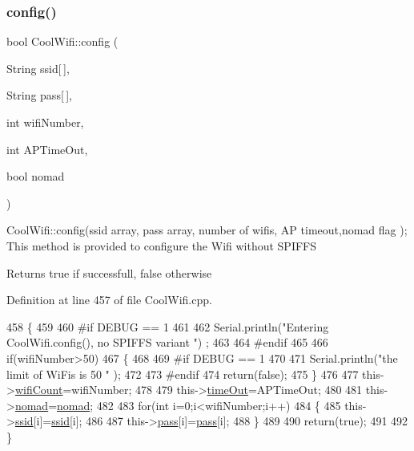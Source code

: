 \subsubsection{\texorpdfstring{config()}{config()}\hspace{0.1cm}{\footnotesize\ttfamily [2/2]}}
{\footnotesize\ttfamily bool Cool\+Wifi\+::config (\begin{DoxyParamCaption}\item[{String}]{ssid\mbox{[}$\,$\mbox{]},  }\item[{String}]{pass\mbox{[}$\,$\mbox{]},  }\item[{int}]{wifi\+Number,  }\item[{int}]{A\+P\+Time\+Out,  }\item[{bool}]{nomad }\end{DoxyParamCaption})}

Cool\+Wifi\+::config(ssid array, pass array, number of wifis, A\+P timeout,nomad flag ); This method is provided to configure the Wifi without S\+P\+I\+F\+FS

\begin{DoxyReturn}{Returns}
true if successfull, false otherwise 
\end{DoxyReturn}


Definition at line 457 of file Cool\+Wifi.\+cpp.


\begin{DoxyCode}
458 \{
459 
460 \textcolor{preprocessor}{#if DEBUG == 1 }
461     
462     Serial.println(\textcolor{stringliteral}{"Entering CoolWifi.config(), no SPIFFS variant "}) ;
463     
464 \textcolor{preprocessor}{#endif}
465     
466     \textcolor{keywordflow}{if}(wifiNumber>50)
467     \{
468     
469 \textcolor{preprocessor}{    #if DEBUG == 1 }
470         
471         Serial.println(\textcolor{stringliteral}{"the limit of WiFis is 50 "} );
472         
473 \textcolor{preprocessor}{    #endif}
474         \textcolor{keywordflow}{return}(\textcolor{keyword}{false});  
475     \}
476 
477     this->\hyperlink{class_cool_wifi_ab133bd92fcb895b884deecd6678592e4}{wifiCount}=wifiNumber;
478 
479     this->\hyperlink{class_cool_wifi_a952111605f25156588b5632caaba1c6f}{timeOut}=APTimeOut;
480 
481     this->\hyperlink{class_cool_wifi_ab7d9643c4af7bac3be331ef008b2ea27}{nomad}=\hyperlink{class_cool_wifi_ab7d9643c4af7bac3be331ef008b2ea27}{nomad};
482     
483     \textcolor{keywordflow}{for}(\textcolor{keywordtype}{int} i=0;i<wifiNumber;i++)
484     \{
485         this->\hyperlink{class_cool_wifi_a893b21d0fed821438733bba2e73fb4c2}{ssid}[i]=\hyperlink{class_cool_wifi_a893b21d0fed821438733bba2e73fb4c2}{ssid}[i];
486         
487         this->\hyperlink{class_cool_wifi_a0c3332a149245aaad060b32593a54c9b}{pass}[i]=\hyperlink{class_cool_wifi_a0c3332a149245aaad060b32593a54c9b}{pass}[i];
488     \}
489         
490     \textcolor{keywordflow}{return}(\textcolor{keyword}{true});
491 
492 \}
\end{DoxyCode}
\mbox{\label{class_cool_wifi_ad060353050f40d032a2dbf9e54a768bf}} 
